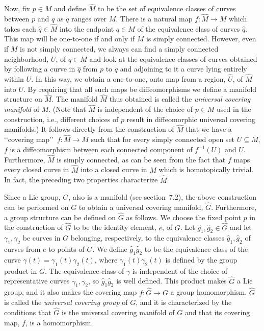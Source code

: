 Now, fix \(p\in M\) and define \(\widehat M\) to be the set of equivalence classes
of curves between \(p\) and \(q\) as \(q\) ranges over \(M\). There is a natural map
\(f:\widehat M\longrightarrow M\) which takes each \(\widehat q\in\widehat M\) into
the endpoint \(q\in M\) of the equivalence class of curves \(\widehat q\). This map
will be one-to-one if and only if \(M\) is simply connected. However, even if \(M\)
is not simply connected, we always can find a simply connected neighborhood, \(U\),
of \(q\in M\) and look at the equivalence classes of curves obtained by following a
curve in \(\widehat q\) from \(p\) to \(q\) and adjoining to it a curve lying entirely
within \(U\). In this way, we obtain a one-to-one, onto map from a region,
\(\widehat U\), of \(\widehat M\) into \(U\). By requiring that all such maps be
diffeomorphisms we define a manifold structure on \(\widehat M\). The manifold
\(\widehat M\) thus obtained is called the \emph{universal covering manifold} of
\(M\). (Note that \(\widehat M\) is independent of the choice of \(p\in M\) used in
the construction, i.e., different choices of \(p\) result in diffeomorphic universal
covering manifolds.) It follows directly from the construction of \(\widehat M\) that
we have a \lq\lq covering map\rq\rq\ \(f:\widehat M\longrightarrow M\) such that
for every simply connected open set \(U\subseteq M\), \(f\) is a diffeomorphism
between each connected component of \(f^{-1}(U)\) and \(U\). Furthermore,
\(\widehat M\) is simply connected, as can be seen from the fact that \(f\) maps every
closed curve in \(\widehat M\) into a closed curve in \(M\) which is homotopically
trivial. In fact, the preceding two properties characterize \(\widehat M\).

Since a Lie group, \(G\), also is a manifold (see section~7.2), the above
construction can be performed on \(G\) to obtain a universal covering manifold,
\(\widehat G\). Furthermore, a group structure can be defined on \(\widehat G\) as
follows. We choose the fixed point \(p\) in the construction of \(\widehat G\) to be
the identity element, \(e\), of \(G\). Let \(\widehat g_1,\widehat g_2\in\widehat G\)
and let \(\gamma_1,\gamma_2\) be curves in \(G\) belonging, respectively, to the
equivalence classes \(\widehat g_1,\widehat g_2\) of curves from \(e\) to points of
\(G\). We define \(\widehat g_1\widehat g_2\) to be the equivalence class of the
curve \(\gamma(t)=\gamma_1(t)\gamma_2(t)\), where
\(\gamma_1(t)\gamma_2(t)\) is defined by the group product in \(G\). The equivalence
class of \(\gamma\) is independent of the choice of representative curves
\(\gamma_1,\gamma_2\), so \(\widehat g_1\widehat g_2\) is well defined. This product
makes \(\widehat G\) a Lie group, and it also makes the covering map
\(f:\widehat G\longrightarrow G\) a group homomorphism. \(\widehat G\) is called
the \emph{universal covering group} of \(G\), and it is characterized by the
conditions that \(\widehat G\) is the universal covering manifold of \(G\) and that
its covering map, \(f\), is a homomorphism.


